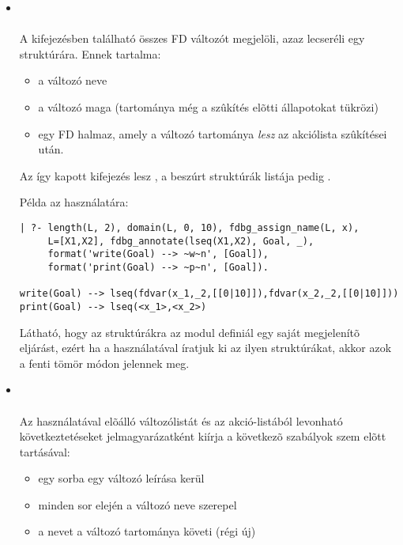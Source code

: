 \begin{itemize}
\item {} \\
   \\
  A  kifejezésben található összes FD változót megjelöli,
  azaz lecseréli egy  struktúrára.  Ennek tartalma:
  \begin{itemize}
  \item a változó neve
  \item a változó maga (tartománya még a szûkítés elõtti állapotokat
    tükrözi)
  \item egy FD halmaz, amely a változó tartománya \emph{lesz} az
     akciólista szûkítései után.
  \end{itemize}
  Az így kapott kifejezés lesz , a beszúrt 
  struktúrák listája pedig .

Példa az  használatára:

\begin{verbatim}
| ?- length(L, 2), domain(L, 0, 10), fdbg_assign_name(L, x), 
     L=[X1,X2], fdbg_annotate(lseq(X1,X2), Goal, _), 
     format('write(Goal) --> ~w~n', [Goal]),
     format('print(Goal) --> ~p~n', [Goal]).

write(Goal) --> lseq(fdvar(x_1,_2,[[0|10]]),fdvar(x_2,_2,[[0|10]]))
print(Goal) --> lseq(<x_1>,<x_2>)
\end{verbatim}

Látható, hogy az  struktúrákra az \fdbg modul definiál egy saját
 megjelenítõ eljárást, ezért ha a  használatával
íratjuk ki az ilyen struktúrákat, akkor azok a fenti tömör módon jelennek meg.

\item {} \\
    \\
  Az  használatával elõálló  változólistát
  és az  akció-listából levonható következtetéseket jelmagyarázatként
  kiírja a következõ szabályok szem elõtt tartásával:
  \begin{itemize}
  \item egy sorba egy változó leírása kerül
  \item minden sor elején a változó neve szerepel
  \item a nevet a változó tartománya követi (régi \cd{->} új)
  \end{itemize}

\end{itemize}

